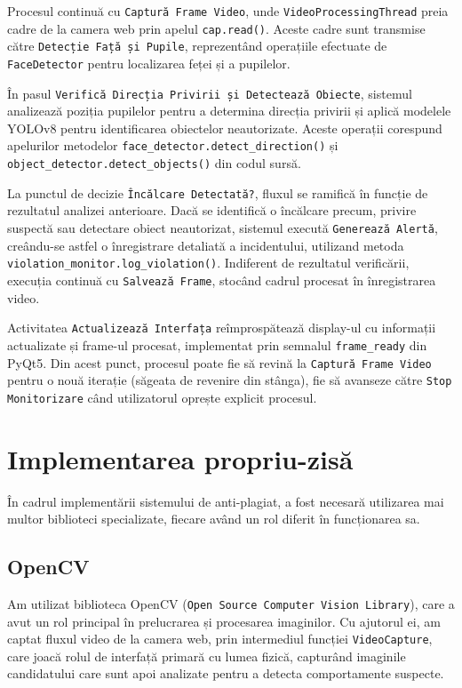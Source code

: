 \documentclass[12pt,a4paper]{article}
\begin{document}
Procesul continuă cu \texttt{Captură Frame Video}, unde \texttt{VideoProcessingThread} preia cadre de la camera web prin apelul \texttt{cap.read()}. Aceste cadre sunt transmise către \texttt{Detecție Față și Pupile}, reprezentând operațiile efectuate de \texttt{FaceDetector} pentru localizarea feței și a pupilelor. 

În pasul \texttt{Verifică Direcția Privirii și Detectează Obiecte}, sistemul analizează poziția pupilelor pentru a determina direcția privirii și aplică modelele YOLOv8 pentru identificarea obiectelor neautorizate. Aceste operații corespund apelurilor metodelor \texttt{face\_detector.detect\_direction()} și \texttt{object\_detector.detect\_objects()} din codul sursă.

La punctul de decizie \texttt{Încălcare Detectată?}, fluxul se ramifică în funcție de rezultatul analizei anterioare. Dacă se identifică o încălcare precum, privire suspectă sau detectare obiect neautorizat, sistemul execută \texttt{Generează Alertă}, creându-se astfel o înregistrare detaliată a incidentului, utilizand metoda \texttt{violation\_monitor.log\_violation()}. Indiferent de rezultatul verificării, execuția continuă cu \texttt{Salvează Frame}, stocând cadrul procesat în înregistrarea video.

Activitatea \texttt{Actualizează Interfața} reîmprospătează display-ul cu informații actualizate și frame-ul procesat, implementat prin semnalul \texttt{frame\_ready} din PyQt5. Din acest punct, procesul poate fie să revină la \texttt{Captură Frame Video} pentru o nouă iterație (săgeata de revenire din stânga), fie să avanseze către \texttt{Stop Monitorizare} când utilizatorul oprește explicit procesul.

\section{Implementarea propriu-zisă}

În cadrul implementării sistemului de anti-plagiat, a fost necesară utilizarea mai multor biblioteci specializate, fiecare având un rol diferit în funcționarea sa.

\subsection{OpenCV}
Am utilizat biblioteca OpenCV (\texttt{Open Source Computer Vision Library}),
care a avut un rol principal în prelucrarea și procesarea imaginilor\cite{hasan2021face}. Cu
ajutorul ei, am captat fluxul video de la camera web, prin intermediul
funcției \texttt{VideoCapture}, care joacă rolul de interfață primară cu lumea
fizică, capturând imaginile candidatului care sunt apoi analizate pentru
a detecta comportamente suspecte.
\end{document}
